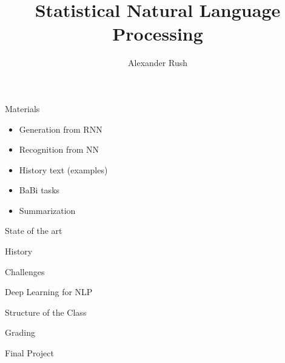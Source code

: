 \documentclass{beamer}
\title{ Statistical Natural Language Processing }
\author{Alexander Rush}
\begin{document}
\begin{frame}
  \titlepage
\end{frame}

\begin{frame}
  Materials
  \begin{itemize}
  \item Generation from RNN
  \item Recognition from NN
  \item History text (examples)
  \item BaBi tasks 
  \item Summarization
  \end{itemize}
\end{frame}

\begin{frame}{State of the art}

\end{frame}


\begin{frame}{History}

\end{frame}

\begin{frame}{Challenges}

\end{frame}



\begin{frame}{Deep Learning for NLP}
  
\end{frame}

\begin{frame}{Structure of the Class}

\end{frame}

\begin{frame}{Grading}
  
\end{frame}

\begin{frame}{Final Project}
  
\end{frame}
\end{document}
